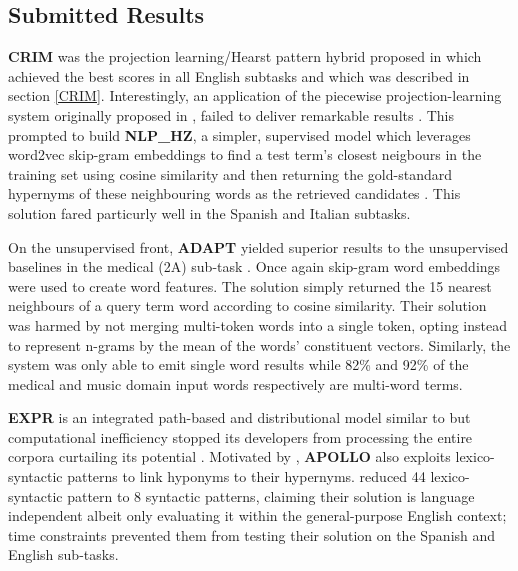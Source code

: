 \subsection{Submitted Results}
\textbf{CRIM} was the projection learning/Hearst pattern hybrid proposed in \citep{bernier2018crim} which achieved the best scores in all English subtasks and which was described in section \ref{CRIM}.  Interestingly, an application of the piecewise projection-learning system originally proposed in \citep{Fu2014}, failed to deliver remarkable results \citep{qiu2018nlp_hz}.  This prompted \citeauthor{qiu2018nlp_hz} to build \textbf{NLP\_HZ}, a simpler, supervised model which leverages word2vec skip-gram embeddings \citep{mikolov2013efficient} to find a test term's closest neigbours in the training set using cosine similarity and then returning the gold-standard hypernyms of these neighbouring words as the retrieved candidates \citep{qiu2018nlp_hz}.  This solution  fared particurly well in the Spanish and Italian subtasks.

On the unsupervised front, \textbf{ADAPT} yielded superior results to the unsupervised baselines in the medical (2A) sub-task \citep{maldonado2018adapt}.  Once again skip-gram word embeddings \citep{mikolov2013efficient} were used to create word features.  The solution simply returned the 15 nearest neighbours of a query term word according to cosine similarity.  Their solution was harmed by not merging multi-token words into a single token, opting instead to represent n-grams by the mean of the words' constituent vectors.  Similarly, the system was only able to emit single word results while 82\% and 92\% of the medical and music domain input words respectively are multi-word terms.

\textbf{EXPR} is an integrated path-based and distributional model similar to \citep{shwartz2016path} but computational inefficiency stopped its developers from processing the entire corpora curtailing its potential \citep{aldine2018expr}.  Motivated by \citep{hearst1992automatic, Snow2004}, \textbf{APOLLO} also exploits lexico-syntactic patterns to link hyponyms to their hypernyms.  \citeauthor{onofrei2018apollo} reduced 44 lexico-syntactic pattern to 8 syntactic patterns,  claiming their solution is language independent albeit only evaluating it within the general-purpose English context; time constraints prevented them from testing their solution on the Spanish and English sub-tasks.

